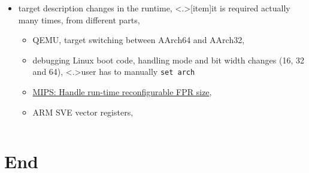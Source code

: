 {\begin{columns}[t]
\begin{column}[t]{0.55\textwidth}
\begin{itemize}
    \item <+->\small target description changes in the runtime,
      \note<.>[item]{it is required actually many times, from different parts,}
      \begin{itemize}
        \item \small QEMU, target switching between AArch64 and AArch32,
        \item \small debugging Linux boot code, handling mode and bit width changes (16, 32 and 64),
          \note<.>{user has to manually \texttt{set arch}}
        \item \small \href{https://sourceware.org/ml/gdb-patches/2016-06/msg00425.html}{MIPS: Handle run-time reconfigurable FPR size},
        \item ARM SVE vector registers,
      \end{itemize}


    \end{itemize}

    \end{column}
  \end{columns}
}

\section{End}


